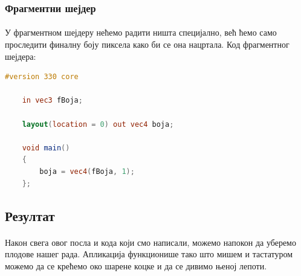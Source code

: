 \documentclass[12pt]{article}
\begin{document}
	\pagebreak
	
	\subsubsection{Фрагментни шејдер}
	\paragraph{}
	У фрагментном шејдеру нећемо радити ништа специјално, већ ћемо само проследити финалну боју пиксела како би се она нацртала. Код фрагментног шејдера:
	\begin{lstlisting}[language=GLSL]
	#version 330 core
	
	in vec3 fBoja;
	
	layout(location = 0) out vec4 boja;
	
	void main()
	{
		boja = vec4(fBoja, 1);
	};
	\end{lstlisting}
	
	\subsection{Резултат}
	\paragraph{}
	Након свега овог посла и кода који смо написали, можемо напокон да уберемо плодове нашег рада. Апликација функционише тако што мишем и тастатуром можемо да се крећемо око шарене коцке и да се дивимо њеној лепоти.
	
\end{document}
